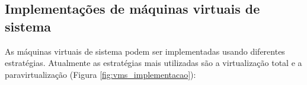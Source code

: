 


\newpage
\subsection{Implementações de máquinas virtuais de sistema}
\label{section:virtestrat}

As máquinas virtuais de sistema podem ser implementadas usando diferentes estratégias. Atualmente as estratégias mais utilizadas
são a virtualização total e a paravirtualização (Figura \ref{fig:vms_implementacao}):

